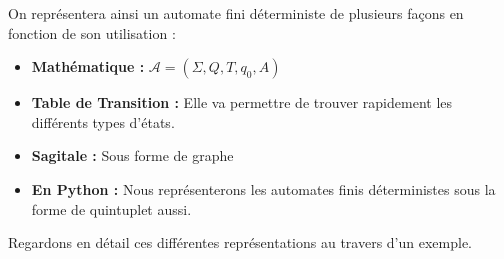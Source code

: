 On représentera ainsi un automate fini déterministe de plusieurs façons en fonction de son utilisation :
\begin{itemize}
    \item \textbf{Mathématique : } $\mathcal{A} = (\Sigma, Q, T, q_0, A) $
    \item \textbf{Table de Transition : } Elle va permettre de trouver rapidement les différents types d'états. 
    \item \textbf{Sagitale : } Sous forme de graphe 
    \item \textbf{En Python : } Nous représenterons les automates finis déterministes sous la forme de quintuplet aussi. 
\end{itemize}
Regardons en détail ces différentes représentations au travers d'un exemple. 

\newpage 


